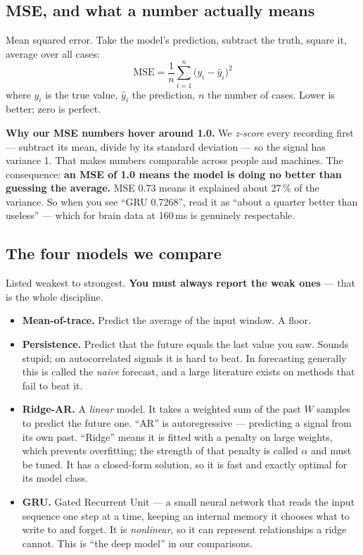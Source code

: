 \documentclass[11pt]{article}
\begin{document}
\subsection{MSE, and what a number actually means}

Mean squared error. Take the model's prediction, subtract the truth, square it,
average over all cases:
\begin{equation}
\mathrm{MSE} = \frac{1}{n}\sum_{i=1}^{n}\bigl(y_i - \hat{y}_i\bigr)^2
\end{equation}
where $y_i$ is the true value, $\hat{y}_i$ the prediction, $n$ the number of
cases. Lower is better; zero is perfect.

\begin{keybox}
\textbf{Why our MSE numbers hover around 1.0.} We \emph{z-score} every recording
first --- subtract its mean, divide by its standard deviation --- so the signal
has variance 1. That makes numbers comparable across people and machines. The
consequence: \textbf{an MSE of 1.0 means the model is doing no better than
guessing the average.} MSE 0.73 means it explained about 27\,\% of the variance.
So when you see ``GRU 0.7268'', read it as ``about a quarter better than useless''
--- which for brain data at 160\,ms is genuinely respectable.
\end{keybox}

\subsection{The four models we compare}

Listed weakest to strongest. \textbf{You must always report the weak ones} ---
that is the whole discipline.

\begin{itemize}
\item \textbf{Mean-of-trace.} Predict the average of the input window. A floor.
\item \textbf{Persistence.} Predict that the future equals the last value you saw.
Sounds stupid; on autocorrelated signals it is hard to beat. In forecasting
generally this is called the \emph{naive} forecast, and a large literature exists
on methods that fail to beat it.
\item \textbf{Ridge-AR.} A \emph{linear} model. It takes a weighted sum of the
past $W$ samples to predict the future one. ``AR'' is autoregressive --- predicting
a signal from its own past. ``Ridge'' means it is fitted with a penalty on large
weights, which prevents overfitting; the strength of that penalty is called
$\alpha$ and must be tuned. It has a closed-form solution, so it is fast and
exactly optimal for its model class.
\item \textbf{GRU.} Gated Recurrent Unit --- a small neural network that reads the
input sequence one step at a time, keeping an internal memory it chooses what to
write to and forget. It is \emph{nonlinear}, so it can represent relationships a
ridge cannot. This is ``the deep model'' in our comparisons.
\end{itemize}
\end{document}
